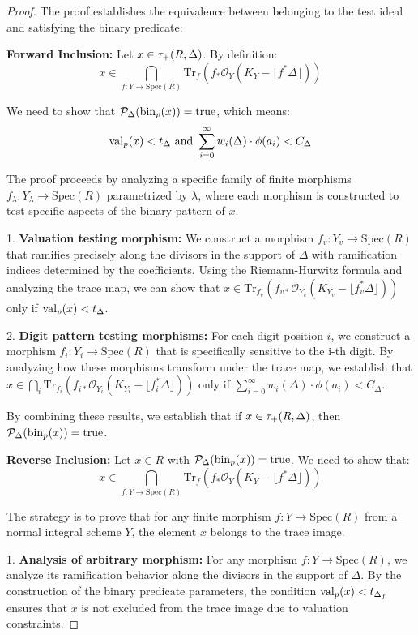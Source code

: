 \begin{proof}
The proof establishes the equivalence between belonging to the test ideal and satisfying the binary predicate:

\textbf{Forward Inclusion:} Let $x \in \tau_+(R,\Delta)$. By definition:
$$x \in \bigcap_{f: Y \to \text{Spec}(R)} \text{Tr}_f(f_*\mathcal{O}_Y(K_Y - \lfloor f^*\Delta\rfloor))$$

We need to show that $\mathcal{P}_{\Delta}(\operatorname{bin}_p(x)) = \text{true}$, which means:
$$\operatorname{val}_p(x) < t_{\Delta} \text{ and } \sum_{i=0}^{\infty} w_i(\Delta) \cdot \phi(a_i) < C_{\Delta}$$

The proof proceeds by analyzing a specific family of finite morphisms $f_\lambda: Y_\lambda \to \text{Spec}(R)$ parametrized by $\lambda$, where each morphism is constructed to test specific aspects of the binary pattern of $x$.

1. \textbf{Valuation testing morphism:} We construct a morphism $f_v: Y_v \to \text{Spec}(R)$ that ramifies precisely along the divisors in the support of $\Delta$ with ramification indices determined by the coefficients. Using the Riemann-Hurwitz formula and analyzing the trace map, we can show that $x \in \text{Tr}_{f_v}(f_{v*}\mathcal{O}_{Y_v}(K_{Y_v} - \lfloor f_v^*\Delta\rfloor))$ only if $\operatorname{val}_p(x) < t_{\Delta}$.

2. \textbf{Digit pattern testing morphisms:} For each digit position $i$, we construct a morphism $f_i: Y_i \to \text{Spec}(R)$ that is specifically sensitive to the i-th digit. By analyzing how these morphisms transform under the trace map, we establish that $x \in \bigcap_i \text{Tr}_{f_i}(f_{i*}\mathcal{O}_{Y_i}(K_{Y_i} - \lfloor f_i^*\Delta\rfloor))$ only if $\sum_{i=0}^{\infty} w_i(\Delta) \cdot \phi(a_i) < C_{\Delta}$.

By combining these results, we establish that if $x \in \tau_+(R,\Delta)$, then $\mathcal{P}_{\Delta}(\operatorname{bin}_p(x)) = \text{true}$.

\textbf{Reverse Inclusion:} Let $x \in R$ with $\mathcal{P}_{\Delta}(\operatorname{bin}_p(x)) = \text{true}$. We need to show that:
$$x \in \bigcap_{f: Y \to \text{Spec}(R)} \text{Tr}_f(f_*\mathcal{O}_Y(K_Y - \lfloor f^*\Delta\rfloor))$$

The strategy is to prove that for any finite morphism $f: Y \to \text{Spec}(R)$ from a normal integral scheme $Y$, the element $x$ belongs to the trace image.

1. \textbf{Analysis of arbitrary morphism:} For any morphism $f: Y \to \text{Spec}(R)$, we analyze its ramification behavior along the divisors in the support of $\Delta$. By the construction of the binary predicate parameters, the condition $\operatorname{val}_p(x) < t_{\Delta_f}$ ensures that $x$ is not excluded from the trace image due to valuation constraints.


\end{proof}
